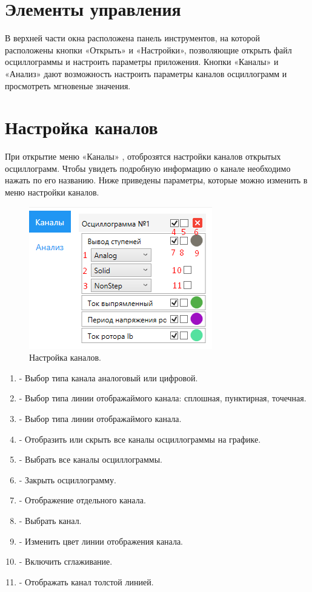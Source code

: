 \documentclass[a4paper,12pt]{article}
\begin{document}
\section*{\hspace{.5cm}Элементы управления }
\hspace{.5cm}В  верхней  части  окна  расположена  панель  инструментов,  на  которой расположены  кнопки «Открыть» и «Настройки», позволяющие открыть файл осциллограммы и настроить параметры приложения. Кнопки «Каналы» и «Анализ» дают возможность настроить параметры каналов осциллограмм и просмотреть мгновеные значения. 

\section*{\hspace{.5cm}Настройка каналов }
\hspace{.5cm}При открытие меню «Каналы» , отоброзятся настройки каналов открытых осциллограмм. Чтобы увидеть подробную информацию о канале необходимо нажать по его названию. Ниже приведены параметры, которые можно изменить в меню настройки каналов.

\begin{figure}[h]
\centering
\includegraphics[width=40ex]{image/Channel.png}
\caption{Настройка каналов.}
\end{figure}

\begin{enumerate}
\item - Выбор типа канала аналоговый или цифровой. 
\item - Выбор типа линии отображаймого канала: сплошная, пунктирная, точечная.
\item - Выбор типа линии отображаймого канала.
\item - Отобразить или скрыть все каналы осциллограммы на графике.
\item - Выбрать все каналы осциллограммы.
\item - Закрыть осциллограмму.
\item - Отображение отдельного канала. 
\item - Выбрать канал.
\item - Изменить цвет линии отображения канала.
\item - Включить сглаживание.
\item - Отображать канал толстой линией.
\end {enumerate}
\end{document}

